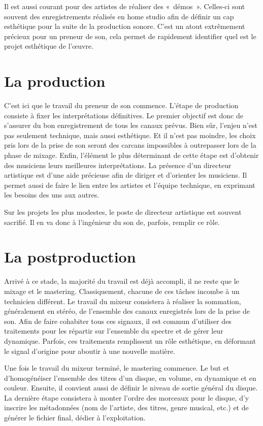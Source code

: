 \documentclass[
]{book}
\begin{document}
Il est aussi courant pour des artistes de réaliser des «~démos~». Celles-ci sont souvent des enregistrements réalisés en home studio afin de définir un cap esthétique pour la suite de la production sonore. C'est un atout extrêmement précieux pour un preneur de son, cela permet de rapidement identifier quel est le projet esthétique de l'œuvre.

\hypertarget{la-production}{%
\section{La production}\label{la-production}}

C'est ici que le travail du preneur de son commence. L'étape de production consiste à fixer les interprétations définitives. Le premier objectif est donc de s'assurer du bon enregistrement de tous les canaux prévus. Bien sûr, l'enjeu n'est pas seulement technique, mais aussi esthétique. Et il n'est pas moindre, les choix pris lors de la prise de son seront des carcans impossibles à outrepasser lors de la phase de mixage. Enfin, l'élément le plus déterminant de cette étape est d'obtenir des musiciens leurs meilleures interprétations. La présence d'un directeur artistique est d'une aide précieuse afin de diriger et d'orienter les musiciens. Il permet aussi de faire le lien entre les artistes et l'équipe technique, en exprimant les besoins des uns aux autres.

Sur les projets les plus modestes, le poste de directeur artistique est souvent sacrifié. Il en va donc à l'ingénieur du son de, parfois, remplir ce rôle.

\hypertarget{la-postproduction}{%
\section{La postproduction}\label{la-postproduction}}

Arrivé à ce stade, la majorité du travail est déjà accompli, il ne reste que le mixage et le mastering. Classiquement, chacune de ces tâches incombe à un technicien différent. Le travail du mixeur consistera à réaliser la sommation, généralement en stéréo, de l'ensemble des canaux enregistrés lors de la prise de son. Afin de faire cohabiter tous ces signaux, il est commun d'utiliser des traitements pour les répartir sur l'ensemble du spectre et de gérer leur dynamique. Parfois, ces traitements remplissent un rôle esthétique, en déformant le signal d'origine pour aboutir à une nouvelle matière.

Une fois le travail du mixeur terminé, le mastering commence. Le but et d'homogénéiser l'ensemble des titres d'un disque, en volume, en dynamique et en couleur. Ensuite, il convient aussi de définir le niveau de sortie général du disque. La dernière étape consistera à monter l'ordre des morceaux pour le disque, d'y inscrire les métadonnées (nom de l'artiste, des titres, genre musical, etc.) et de générer le fichier final, dédier à l'exploitation.
\end{document}
